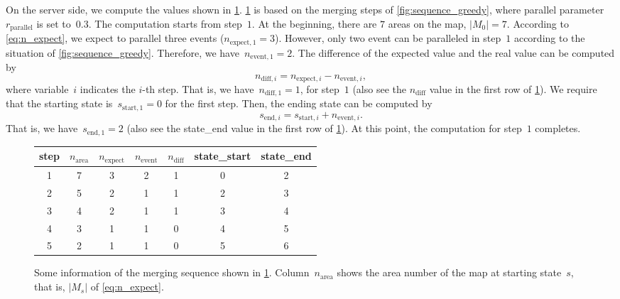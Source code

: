 \documentclass[ijgi,article,submit,moreauthors,pdftex]{Definitions/mdpi}
\begin{document}
On the server side, we compute the values shown in \tbl\ref{tbl:sequence_greedy}.
\tbl\ref{tbl:sequence_greedy} is based on the merging steps of
\fig\ref{fig:sequence_greedy},
where parallel parameter~$r_\mathrm{parallel}$ is set to~$0.3$.
The computation starts from step~$1$.
At the beginning, there are $7$ areas on the map, \ie$|M_0| = 7$.
According to \eq\ref{eq:n_expect},
we expect to parallel three events ($n_{\mathrm{expect},1} = 3$).
However, only two event can be paralleled in step~$1$ 
according to the situation of \fig\ref{fig:sequence_greedy}.
Therefore, we have~$n_{\mathrm{event},1} = 2$.
The difference of the expected value and the real value
can be computed by
\begin{equation}
\label{eq:n_diff}
n_{\mathrm{diff},i} = n_{\mathrm{expect},i} - n_{\mathrm{event},i},
\end{equation}
where variable~$i$ indicates the $i$-th step.
That is, we have~$n_{\mathrm{diff},1}=1$, for step~$1$
(also see the $n_\mathrm{diff}$ value in the first row of \tbl\ref{tbl:sequence_greedy}).
We require that the starting state is~$s_{\mathrm{start},1} = 0$ for the first step.
Then, the ending state can be computed by
\begin{equation}
\label{eq:state_end}
s_{\mathrm{end},i} = s_{\mathrm{start},i} + n_{\mathrm{event},i}.
\end{equation}
That is, we have~$s_{\mathrm{end},1}=2$
(also see the state\_end value in the first row of \tbl\ref{tbl:sequence_greedy}).
At this point, the computation for step~$1$ completes.


\begin{figure}[tb]
%
%
%
\captionsetup*{type=table} %
\caption{Some information of the merging sequence shown in \tbl\ref{tbl:sequence_greedy}.
Column~$n_\mathrm{area}$ shows the area number of the map at starting state~$s$,
that is, $|M_s|$ of \eq\ref{eq:n_expect}.
}
\label{tbl:sequence_greedy}
\centering
\begin{tabular}{ccccccc}
	\hline
	step & $n_\mathrm{area}$ & $n_\mathrm{expect}$ 
	& $n_\mathrm{event}$ & $n_\mathrm{diff}$ & state\_start & state\_end \\ \hline
	1        & 7      & 3        & 2        & 1     & 0      & 2      \\
	2        & 5      & 2        & 1        & 1     & 2      & 3      \\
	3        & 4      & 2        & 1        & 1     & 3      & 4      \\
	4        & 3      & 1        & 1        & 0     & 4      & 5      \\
	5        & 2      & 1        & 1        & 0     & 5      & 6      \\ \hline
\end{tabular}
\end{figure}
\end{document}

